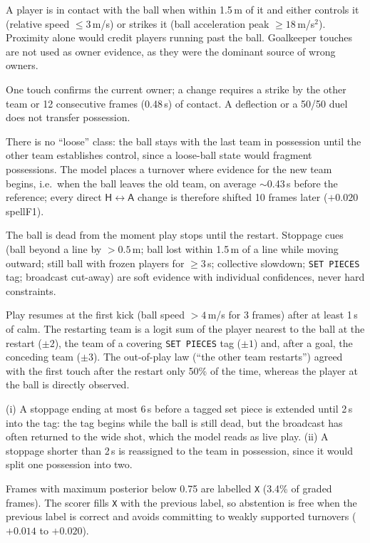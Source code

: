 \documentclass[10pt,a4paper]{article}
\newcommand{\code}[1]{\texttt{#1}}
\newcommand{\lH}{\mathsf{H}}
\newcommand{\lA}{\mathsf{A}}
\begin{document}
\begin{description}[style=unboxed,leftmargin=0pt,itemsep=2pt]
\item[Touch.] A player is in contact with the ball when within 1.5\,m of it and either controls it
  (relative speed $\le3$\,m/s) or strikes it (ball acceleration peak $\ge18$\,m/s$^2$). Proximity
  alone would credit players running past the ball. Goalkeeper touches are not used as owner
  evidence, as they were the dominant source of wrong owners.
\item[Change of possession.] One touch confirms the current owner; a change requires a strike by the
  other team or 12 consecutive frames (0.48\,s) of contact. A deflection or a 50/50 duel does not
  transfer possession.
\item[Loose and contested balls.] There is no ``loose'' class: the ball stays with the last team in
  possession until the other team establishes control, since a loose-ball state would fragment
  possessions. The model places a turnover where evidence for the new team begins, i.e.\ when the
  ball leaves the old team, on average $\sim$0.43\,s before the reference; every direct
  $\lH\leftrightarrow\lA$ change is therefore shifted 10 frames later ($+0.020$ spellF1).
\item[Dead ball.] The ball is dead from the moment play stops until the restart. Stoppage cues
  (ball beyond a line by $>0.5$\,m; ball lost within 1.5\,m of a line while moving outward; still
  ball with frozen players for $\ge3$\,s; collective slowdown; \code{SET PIECES} tag; broadcast
  cut-away) are soft evidence with individual confidences, never hard constraints.
\item[Restart and restarting team.] Play resumes at the first kick (ball speed $>4$\,m/s for 3
  frames) after at least 1\,s of calm. The restarting team is a logit sum of the player nearest to the
  ball at the restart ($\pm2$), the team of a covering \code{SET PIECES} tag ($\pm1$) and, after a
  goal, the conceding team ($\pm3$). The out-of-play law (``the other team restarts'') agreed with the
  first touch after the restart only 50\% of the time, whereas the player at the ball is directly
  observed.
\item[Stoppage boundaries.] (i) A stoppage ending at most 6\,s before a tagged set piece is extended
  until 2\,s into the tag: the tag begins while the ball is still dead, but the broadcast has often
  returned to the wide shot, which the model reads as live play. (ii) A stoppage shorter than 2\,s is
  reassigned to the team in possession, since it would split one possession into two.
\item[Abstention.] Frames with maximum posterior below 0.75 are labelled \code{X} (3.4\% of graded
  frames). The scorer fills \code{X} with the previous label, so abstention is free when the previous
  label is correct and avoids committing to weakly supported turnovers ($+0.014$ to $+0.020$).
\end{description}
\end{document}

